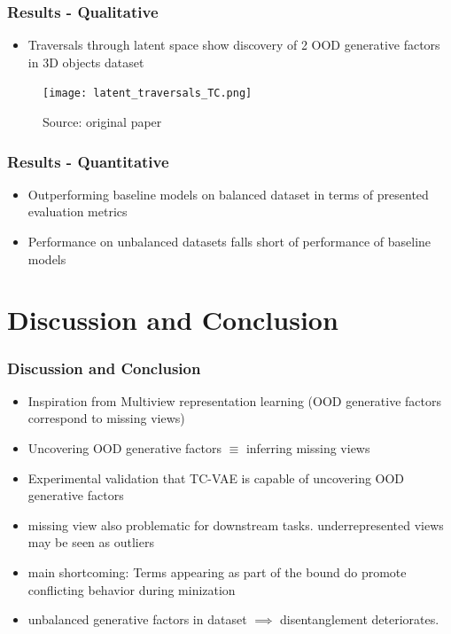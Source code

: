 \documentclass{beamer}
\theoremstyle{definition}
\begin{document}
    \begin{frame}
      \frametitle{Results - Qualitative}
      \begin{itemize}
        \item Traversals through latent space show discovery of 2 OOD generative factors in 3D objects dataset
      \end{itemize}
      \begin{figure}
        \centering
        \texttt{[image: latent\_traversals\_TC.png]}
        \captionsetup{justification=centering}
        \caption*{\tiny{Source: original paper}}

      \end{figure}
    \end{frame}

    \begin{frame}
      \frametitle{Results - Quantitative}
      \begin{itemize}
        \item Outperforming baseline models on balanced dataset in terms of presented evaluation metrics

        \item Performance on unbalanced datasets falls short of performance of baseline models
      \end{itemize}
    \end{frame}

  \section{Discussion and Conclusion}
    \begin{frame}
      \frametitle{Discussion and Conclusion}
      \begin{itemize}
        \item Inspiration from Multiview representation learning (OOD generative factors correspond to missing views)
        \item Uncovering OOD generative factors $\equiv$ inferring missing views
        \item Experimental validation that TC-VAE is capable of uncovering OOD generative factors
        \item missing view also problematic for downstream tasks. underrepresented views may be seen as outliers
        \item main shortcoming: Terms appearing as part of the bound do promote conflicting behavior during minization
        \item unbalanced generative factors in dataset $\implies$ disentanglement deteriorates.
      \end{itemize}
    \end{frame}
\end{document}
